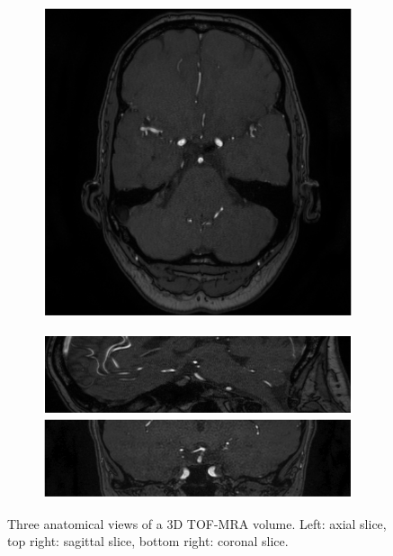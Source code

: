 \begin{figure}[htp]
	\centering
	\begin{subfigure}{.33\linewidth}
		\includegraphics[width=\linewidth]{figures/tof-mra-axial.png}
	\end{subfigure}
	\begin{subfigure}{.63\linewidth}
		\includegraphics[width=\linewidth]{figures/tof-mra-sag.png}
		\includegraphics[width=\linewidth]{figures/tof-mra-cor.png}
	\end{subfigure}
	\caption[Axial, sagittal and coronal slices of 3D TOF-MRA]{Three anatomical views of a 3D TOF-MRA volume. Left: axial slice, top right: sagittal slice, bottom right: coronal slice.}
	\label{fig:tof-3views.png}
\end{figure}


